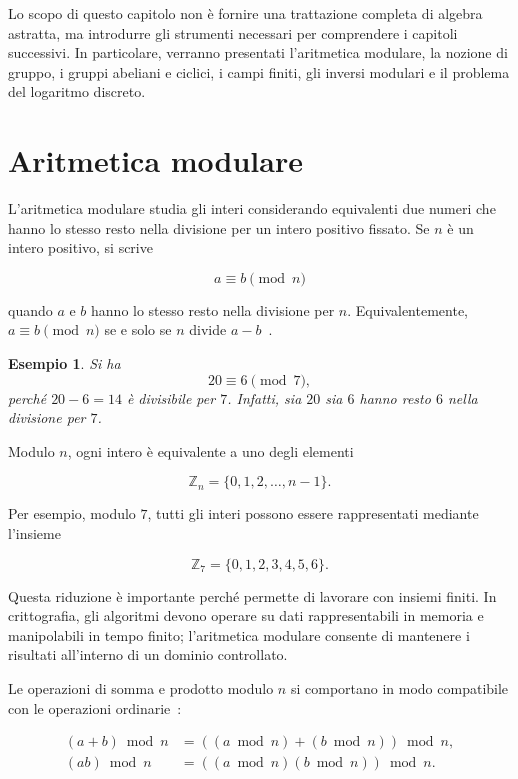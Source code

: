 \documentclass[12pt,a4paper,oneside]{report}
\newtheorem{example}{Esempio}[chapter]
\begin{document}
Lo scopo di questo capitolo non è fornire una trattazione completa di algebra astratta, ma introdurre gli strumenti necessari per comprendere i capitoli successivi. In particolare, verranno presentati l'aritmetica modulare, la nozione di gruppo, i gruppi abeliani e ciclici, i campi finiti, gli inversi modulari e il problema del logaritmo discreto.

\section{Aritmetica modulare}

L'aritmetica modulare studia gli interi considerando equivalenti due numeri che hanno lo stesso resto nella divisione per un intero positivo fissato. Se \(n\) è un intero positivo, si scrive

\begin{equation}
    a \equiv b \pmod n
\end{equation}

quando \(a\) e \(b\) hanno lo stesso resto nella divisione per \(n\). Equivalentemente, \(a \equiv b \pmod n\) se e solo se \(n\) divide \(a-b\)~\cite{margara_publickey}.

\begin{example}
Si ha
\[
20 \equiv 6 \pmod 7,
\]
perché \(20-6=14\) è divisibile per \(7\). Infatti, sia \(20\) sia \(6\) hanno resto \(6\) nella divisione per \(7\).
\end{example}

Modulo \(n\), ogni intero è equivalente a uno degli elementi

\[
\mathbb{Z}_n = \{0,1,2,\ldots,n-1\}.
\]

Per esempio, modulo \(7\), tutti gli interi possono essere rappresentati mediante l'insieme

\[
\mathbb{Z}_7 = \{0,1,2,3,4,5,6\}.
\]

Questa riduzione è importante perché permette di lavorare con insiemi finiti. In crittografia, gli algoritmi devono operare su dati rappresentabili in memoria e manipolabili in tempo finito; l'aritmetica modulare consente di mantenere i risultati all'interno di un dominio controllato.

Le operazioni di somma e prodotto modulo \(n\) si comportano in modo compatibile con le operazioni ordinarie~\cite{margara_publickey}:

\begin{align}
    (a+b) \bmod n &= ((a \bmod n)+(b \bmod n)) \bmod n, \\
    (ab) \bmod n &= ((a \bmod n)(b \bmod n)) \bmod n.
\end{align}
\end{document}
